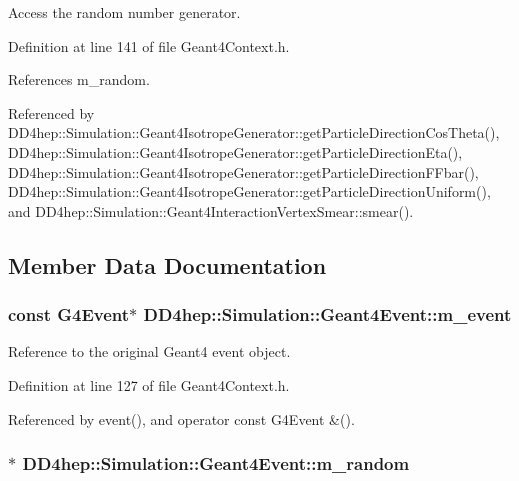 Access the random number generator. 

Definition at line 141 of file Geant4Context.h.

References m\_\-random.

Referenced by DD4hep::Simulation::Geant4IsotropeGenerator::getParticleDirectionCosTheta(), DD4hep::Simulation::Geant4IsotropeGenerator::getParticleDirectionEta(), DD4hep::Simulation::Geant4IsotropeGenerator::getParticleDirectionFFbar(), DD4hep::Simulation::Geant4IsotropeGenerator::getParticleDirectionUniform(), and DD4hep::Simulation::Geant4InteractionVertexSmear::smear().

\subsection{Member Data Documentation}
\hypertarget{class_d_d4hep_1_1_simulation_1_1_geant4_event_a1d336fefbd6316dc5373a3b2d362cffa}{
\subsubsection[{m\_\-event}]{\setlength{\rightskip}{0pt plus 5cm}const G4Event$\ast$ {\bf DD4hep::Simulation::Geant4Event::m\_\-event}}}
\label{class_d_d4hep_1_1_simulation_1_1_geant4_event_a1d336fefbd6316dc5373a3b2d362cffa}


Reference to the original Geant4 event object. 

Definition at line 127 of file Geant4Context.h.

Referenced by event(), and operator const G4Event \&().\hypertarget{class_d_d4hep_1_1_simulation_1_1_geant4_event_a0eb7e282d0f186db2a738cc3ac9e1718}{
\subsubsection[{m\_\-random}]{$\ast$ {\bf DD4hep::Simulation::Geant4Event::m\_\-random}}}
\label{class_d_d4hep_1_1_simulation_1_1_geant4_event_a0eb7e282d0f186db2a738cc3ac9e1718}


